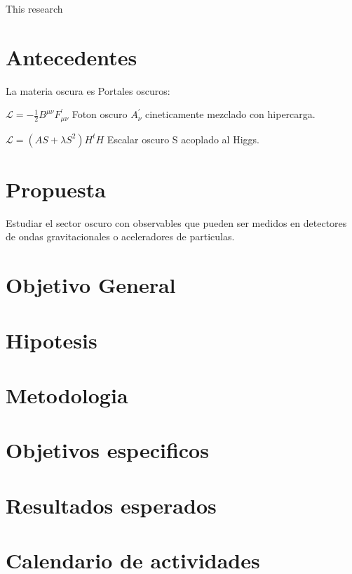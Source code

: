 \documentclass[final,12p]{article}
\begin{document}
  \vspace{0.5cm}
   
This research 

  \hspace{2pt}
\vfill

\newpage
\section{Antecedentes}

La materia oscura es 
Portales oscuros: 

$\mathcal{L} = - \frac{1}{2} B^{\mu \nu} F^{'}_{\mu \nu}$ Foton oscuro $A^{'}_{\nu}$ cineticamente mezclado con hipercarga.

$\mathcal{L} = (AS + \lambda S^2) H^t H$ Escalar oscuro S acoplado al Higgs.

\section{Propuesta}

Estudiar el sector oscuro con observables que pueden ser medidos en detectores de ondas gravitacionales o aceleradores de particulas. \cite{Griff}

\section{Objetivo General}

\section{Hipotesis}

\section{Metodologia}

\section{Objetivos especificos}

\section{Resultados esperados}

\section{Calendario de actividades}
\end{document}
